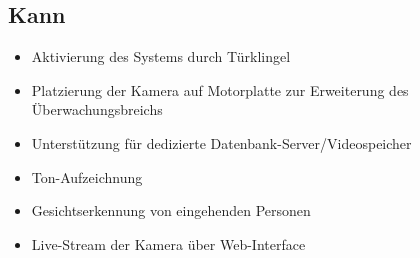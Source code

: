 \subsection{Kann}
\label{sec:kann}
\begin{itemize}
    \item Aktivierung des Systems durch T\"urklingel
    \item Platzierung der Kamera auf Motorplatte zur Erweiterung des \"Uberwachungsbreichs
    \item Unterst\"utzung f\"ur dedizierte Datenbank-Server/Videospeicher
    \item Ton-Aufzeichnung
    \item Gesichtserkennung von eingehenden Personen
    \item Live-Stream der Kamera \"uber Web-Interface
\end{itemize}

\newpage